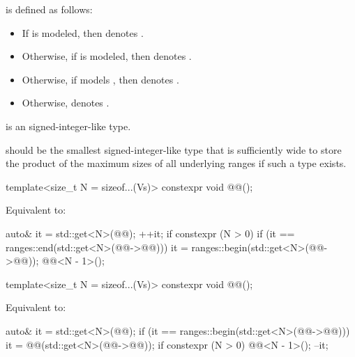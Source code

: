 \pnum
{} is defined as follows:
\begin{itemize}
\item
If 
is modeled,
then  denotes .
\item
Otherwise,
if 
is modeled,
then  denotes .
\item
Otherwise,
if  models ,
then  denotes .
\item
Otherwise,  denotes .
\end{itemize}

\pnum
{} is
an 
signed-integer-like type.

\pnum
\recommended
{} should be
the smallest signed-integer-like type
that is sufficiently wide to store
the product of the maximum sizes of all underlying ranges
if such a type exists.

\pnum
\begin{itemdecl}
template<size_t N = sizeof...(Vs)>
  constexpr void @@();
\end{itemdecl}

\begin{itemdescr}
\pnum
\effects
Equivalent to:
\begin{codeblock}
auto& it = std::get<N>(@@);
++it;
if constexpr (N > 0) {
  if (it == ranges::end(std::get<N>(@@->@@))) {
    it = ranges::begin(std::get<N>(@@->@@));
    @@<N - 1>();
  }
}
\end{codeblock}
\end{itemdescr}

\begin{itemdecl}
template<size_t N = sizeof...(Vs)>
  constexpr void @@();
\end{itemdecl}

\begin{itemdescr}
\pnum
\effects
Equivalent to:
\begin{codeblock}
auto& it = std::get<N>(@@);
if (it == ranges::begin(std::get<N>(@@->@@))) {
  it = @@(std::get<N>(@@->@@));
  if constexpr (N > 0) {
    @@<N - 1>();
  }
}
--it;
\end{codeblock}
\end{itemdescr}

